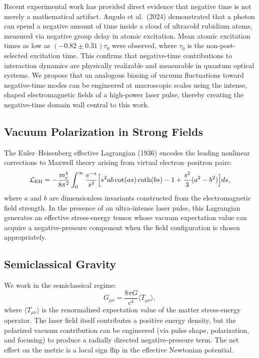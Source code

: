 \documentclass[11pt,a4paper]{article}
\begin{document}
Recent experimental work has provided direct evidence that negative time is not merely a mathematical artifact. Angulo et al.\ (2024) demonstrated that a photon can spend a negative amount of time inside a cloud of ultracold rubidium atoms, measured via negative group delay in atomic excitation. Mean atomic excitation times as low as $(-0.82 \pm 0.31)\tau_0$ were observed, where $\tau_0$ is the non-post-selected excitation time. This confirms that negative-time contributions to interaction dynamics are physically realizable and measurable in quantum optical systems. We propose that an analogous biasing of vacuum fluctuations toward negative-time modes can be engineered at macroscopic scales using the intense, shaped electromagnetic fields of a high-power laser pulse, thereby creating the negative-time domain wall central to this work.

\subsection{Vacuum Polarization in Strong Fields}

The Euler--Heisenberg effective Lagrangian (1936) encodes the leading nonlinear corrections to Maxwell theory arising from virtual electron--positron pairs:
\[
\mathcal{L}_{\rm EH} = -\frac{m_e^4}{8\pi^2} \int_0^\infty \frac{e^{-s}}{s^3} \Bigl[ s^2 ab \cot(as) \coth(bs) - 1 + \frac{s^2}{3}(a^2 - b^2) \Bigr] ds,
\]
where $a$ and $b$ are dimensionless invariants constructed from the electromagnetic field strength. In the presence of an ultra-intense laser pulse, this Lagrangian generates an effective stress-energy tensor whose vacuum expectation value can acquire a negative-pressure component when the field configuration is chosen appropriately.

\subsection{Semiclassical Gravity}

We work in the semiclassical regime:
\[
G_{\mu\nu} = \frac{8\pi G}{c^4} \langle T_{\mu\nu} \rangle,
\]
where $\langle T_{\mu\nu} \rangle$ is the renormalized expectation value of the matter stress-energy operator. The laser field itself contributes a positive energy density, but the polarized vacuum contribution can be engineered (via pulse shape, polarization, and focusing) to produce a radially directed negative-pressure term. The net effect on the metric is a local sign flip in the effective Newtonian potential.
\end{document}
